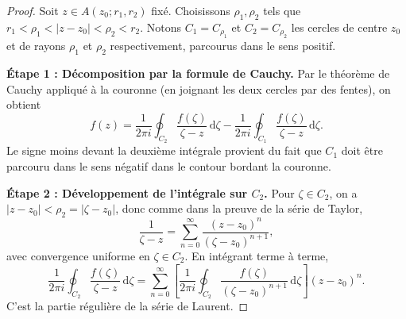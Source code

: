 \documentclass[12pt,a4paper,openany]{book}
\theoremstyle{definition}
\theoremstyle{plain}
\theoremstyle{remark}
\newcommand{\dd}{\mathrm{d}}
\newcommand{\abs}[1]{\left|#1\right|}
\begin{document}
\begin{proof}
Soit $z \in A(z_0; r_1, r_2)$ fixé. Choisissons $\rho_1, \rho_2$
tels que $r_1 < \rho_1 < \abs{z - z_0} < \rho_2 < r_2$. Notons
$C_1 = C_{\rho_1}$ et $C_2 = C_{\rho_2}$ les cercles de centre $z_0$
et de rayons $\rho_1$ et $\rho_2$ respectivement, parcourus dans le
sens positif.

\medskip
\noindent\textbf{Étape 1 : Décomposition par la formule de Cauchy.}
Par le théorème de Cauchy appliqué à la couronne (en joignant les deux
cercles par des fentes), on obtient
\[
  f(z) = \frac{1}{2\pi i}\oint_{C_2}\frac{f(\zeta)}{\zeta - z}\,\dd\zeta
  - \frac{1}{2\pi i}\oint_{C_1}\frac{f(\zeta)}{\zeta - z}\,\dd\zeta.
\]
Le signe moins devant la deuxième intégrale provient du fait que $C_1$
doit être parcouru dans le sens négatif dans le contour bordant la
couronne.

\begin{center}
\end{center}

\medskip
\noindent\textbf{Étape 2 : Développement de l'intégrale sur $C_2$.}
Pour $\zeta \in C_2$, on a $\abs{z - z_0} < \rho_2 = \abs{\zeta - z_0}$,
donc comme dans la preuve de la série de Taylor,
\[
  \frac{1}{\zeta - z} = \sum_{n=0}^{\infty}
  \frac{(z-z_0)^n}{(\zeta - z_0)^{n+1}},
\]
avec convergence uniforme en $\zeta \in C_2$. En intégrant terme à terme,
\[
  \frac{1}{2\pi i}\oint_{C_2}\frac{f(\zeta)}{\zeta - z}\,\dd\zeta
  = \sum_{n=0}^{\infty}\left[\frac{1}{2\pi i}\oint_{C_2}
  \frac{f(\zeta)}{(\zeta - z_0)^{n+1}}\,\dd\zeta\right](z-z_0)^n.
\]
C'est la partie régulière de la série de Laurent.


\end{proof}
\end{document}
